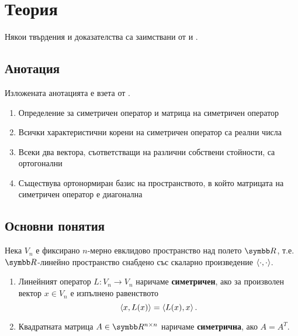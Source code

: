 \documentclass[
  headings=standardclasses,
  bibliography=totocnumbered,
]{scrartcl}
\title{\Title{2}}
\subtitle{Симетрични оператори в крайномерни евклидови пространства. Основни свойства. Теорема за диагонализация.}
\author{Янис Василев}
\date{\Revision{5 юли 2019}}
\begin{document}
\maketitle

\section{Теория}

Някои твърдения и доказателства са заимствани от \cite{Knapp} и \cite{RoyachkiNotes}.

\subsection{Анотация}

Изложената анотацията е взета от \cite{Syllabus}.

\begin{enumerate}
  \item Определение за симетричен оператор и матрица на симетричен оператор
  \item Всички характеристични корени на симетричен оператор са реални числа
  \item Всеки два вектора, съответстващи на различни собствени стойности, са ортогонални
  \item Съществува ортонормиран базис на пространството, в който матрицата на симетричен оператор е диагонална
\end{enumerate}

\subsection{Основни понятия}

Нека \( V_n \) е фиксирано \( n \)-мерно евклидово пространство над полето \( \R \), т.е. \( \R \)-линейно пространство снабдено със скаларно произведение \( \left\langle \cdot, \cdot \right\rangle \).

\begin{definition}
  \mbox{}
  \begin{enumerate}
    \item Линейният оператор \( L: V_n \to V_n \) наричаме \textbf{симетричен}, ако за произволен вектор \( x \in V_n \) е изпълнено равенството
    \begin{equation*}
      \left\langle x, L(x) \right\rangle = \left\langle L(x), x \right\rangle.
    \end{equation*}

    \item Квадратната матрица \( A \in \R^{n \times n} \) наричаме \textbf{симетрична}, ако \( A = A^T \).
  \end{enumerate}
\end{definition}
\end{document}
